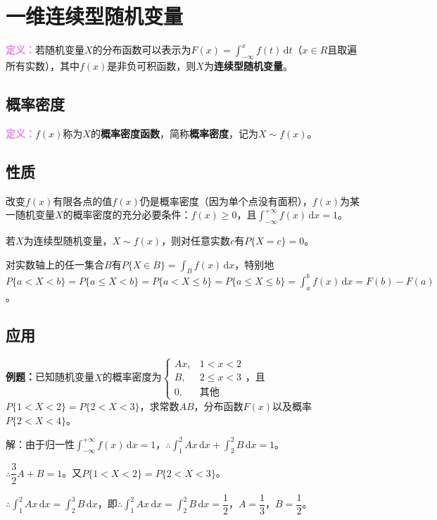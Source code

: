 \documentclass[UTF8, 12pt]{ctexart}
\begin{document}
\section{一维连续型随机变量}

\textcolor{violet}{\textbf{定义：}}若随机变量$X$的分布函数可以表示为$F(x)=\int_{-\infty}^xf(t)\,\textrm{d}t$（$x\in R$且取遍所有实数），其中$f(x)$是非负可积函数，则$X$为\textbf{连续型随机变量}。

\subsection{概率密度}

\textcolor{violet}{\textbf{定义：}}$f(x)$称为$X$的\textbf{概率密度函数}，简称\textbf{概率密度}，记为$X\sim f(x)$。

\subsection{性质}

改变$f(x)$有限各点的值$f(x)$仍是概率密度（因为单个点没有面积），$f(x)$为某一随机变量$X$的概率密度的充分必要条件：$f(x)\geqslant0$，且$\int_{-\infty}^{+\infty}f(x)\,\textrm{d}x=1$。

若$X$为连续型随机变量，$X\sim f(x)$，则对任意实数$c$有$P\{X=c\}=0$。

对实数轴上的任一集合$B$有$P\{X\in B\}=\int_Bf(x)\,\textrm{d}x$，特别地$P\{a<X<b\}=P\{a\leqslant X<b\}=P\{a<X\leqslant b\}=P\{a\leqslant X\leqslant b\}=\int_a^bf(x)\,\textrm{d}x=F(b)-F(a)$。

\subsection{应用}

\textbf{例题：}已知随机变量$X$的概率密度为$\left\{\begin{array}{ll}
    Ax, & 1<x<2 \\
    B, & 2\leqslant x<3 \\
    0, & \text{其他}
\end{array}\right.$，且$P\{1<X<2\}=P\{2<X<3\}$，求常数$AB$，分布函数$F(x)$以及概率$P\{2<X<4\}$。

解：由于归一性$\int_{-\infty}^{+\infty}f(x)\,\textrm{d}x=1$，$\therefore\int_1^2Ax\,\textrm{d}x+\int_2^2B\,\textrm{d}x=1$。

$\therefore\dfrac{3}{2}A+B=1$。又$P\{1<X<2\}=P\{2<X<3\}$。

$\therefore\int_1^2Ax\,\textrm{d}x=\int_2^3B\,\textrm{d}x$，即$\therefore\int_1^2Ax\,\textrm{d}x=\int_2^2B\,\textrm{d}x=\dfrac{1}{2}$，$A=\dfrac{1}{3}$，$B=\dfrac{1}{2}$。
\end{document}

